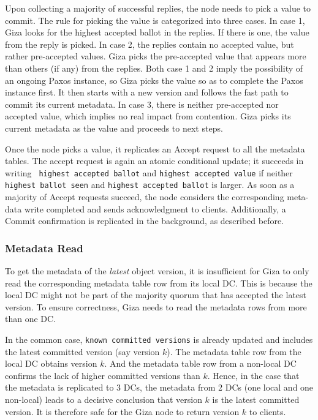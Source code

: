 Upon collecting a majority of successful replies, the {\name} node needs to pick a value to commit.
The rule for picking the value is categorized into three cases.
In case 1, Giza looks for the highest accepted ballot in the replies.
If there is one, the value from the reply is picked.
In case 2, the replies contain no accepted value, but rather pre-accepted values.
Giza picks the pre-accepted value that appears more than others (if any) from the replies.
Both case 1 and 2 imply the possibility of an ongoing Paxos instance,
so Giza picks the value so as to complete the Paxos instance first.
It then starts with a new version and follows the fast path to commit its current metadata.
In case 3, there is neither pre-accepted nor accepted value,
which implies no real impact from contention.
Giza picks its current metadata as the value and proceeds to next steps.

Once the {\name} node picks a value, it replicates an Accept request to all the metadata tables.
The accept request is again an atomic conditional update; it succeeds in writing {\tt
highest accepted ballot} and {\tt highest accepted value} if neither {\tt
highest ballot seen} and {\tt highest accepted ballot} is larger.
As soon as a majority of Accept requests succeed, the \name node considers the
corresponding meta-data write completed and sends acknowledgment to clients.
Additionally, a Commit confirmation is replicated in the background, as described before.

\subsubsection{Metadata Read}

To get the metadata of the \emph{latest} object version,
it is insufficient for Giza to only read the corresponding metadata table row from its local DC.
This is because the local DC might not be part of the majority quorum that has accepted the latest version.
To ensure correctness, Giza needs to read the metadata rows from more than one DC.

In the common case,
{\tt known committed versions} is already updated and includes the latest committed version (say version $k$).
The metadata table row from the local DC obtains version $k$.
And the metadata table row from a non-local DC confirms the lack of higher committed versions than $k$.
Hence, in the case that the metadata is replicated to 3 DCs,
the metadata from 2 DCs (one local and one non-local) leads to a decisive conclusion that version $k$ is the latest committed version.
It is therefore safe for the Giza node to return version $k$ to clients.

